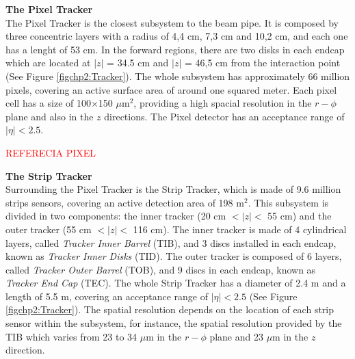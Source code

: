
\textbf{The Pixel Tracker}\\

The Pixel Tracker is the closest subsystem to the beam pipe. It is 
composed by three concentric layers with a radius of 4,4 cm, 7,3 cm and 10,2 cm, and each one has a lenght of 53 cm. In 
the forward regions, there are two disks in each endcap which are located at $|z|$ = 34.5 cm and $|z|$ =  46,5 cm from 
the interaction point (See Figure \ref{figchp2:Tracker}). The whole subsystem has 
approximately 66 million pixels, covering an active surface area of around
one squared meter. Each pixel cell has a size of 100$\times$150 $\mu$m$^{2}$, providing a high 
spacial resolution in the $r-\phi$ plane and also in the $z$ directions. The Pixel detector has 
an acceptance range of $|\eta| < 2.5$.

\textcolor{red}{REFERECIA PIXEL}

\textbf{The Strip Tracker} \\

Surrounding the Pixel Tracker is the Strip Tracker, which is made of 9.6 million strips sensors,
covering an active detection area of 198 m$^{2}$. This subsystem is divided in two 
components: the inner tracker (20 cm $< |z| <$ 55 cm) and the outer 
tracker (55 cm $< |z| <$ 116 cm). The inner tracker
is made of 4 cylindrical layers, called \textit{Tracker Inner Barrel} (TIB), and 3 discs
installed in each endcap, known as \textit{Tracker Inner Disks} (TID). The outer tracker
is composed of 6 layers, called \textit{Tracker Outer Barrel} (TOB), and 9 discs in each 
endcap, known as \textit{Tracker End Cap} (TEC). The whole Strip Tracker has 
a diameter of 2.4 m and a length of 5.5 m, covering an acceptance range 
of $|\eta| < 2.5$ (See Figure \ref{figchp2:Tracker}). The spatial resolution depends 
on the location of each strip sensor within the subsystem, for instance, the spatial 
resolution provided by the TIB which varies from 23 to 34 $\mu$m in the $r-\phi$ plane and 23 $\mu$m in 
the $z$ direction. \\

